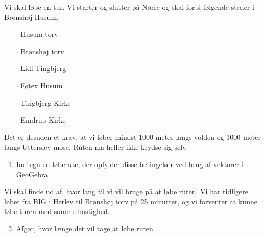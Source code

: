 Vi skal løbe en tur. Vi starter og slutter på Nørre og skal forbi følgende steder i Brønshøj-Husum.
\begin{itemize}
	\item[$\cdot$] Husum torv
	\item[$\cdot$] Brønshøj torv
	\item[$\cdot$] Lidl Tingbjerg
	\item[$\cdot$] Føtex Husum
	\item[$\cdot$] Tingbjerg Kirke
	\item[$\cdot$] Emdrup Kirke
\end{itemize}
Det er desuden et krav, at vi løber mindst 1000 meter langs volden og 1000 meter langs Utterslev mose. Ruten må heller ikke krydse sig selv. 

\begin{enumerate}[label = \roman*)]
	\item Indtegn en løberute, der opfylder disse betingelser ved brug af vektorer i GeoGebra
\end{enumerate}
Vi skal finde ud af, hvor lang til vi vil bruge på at løbe ruten. Vi har tidligere løbet fra BIG i Herlev til Brønshøj torv på 25 minutter, og vi forventer at kunne løbe turen med samme hastighed.
\begin{enumerate}[label = \roman*)]
	\setcounter{enumi}{1}
	\item Afgør, hvor længe det vil tage at løbe ruten.
\end{enumerate}

